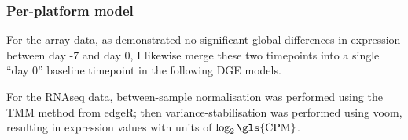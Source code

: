 

\subsubsection{Per-platform  model}

For the array data, as \autocite{sobolev2016AdjuvantedInfluenzaH1N1Vaccination} demonstrated no significant global differences in expression between day -7 and day 0, I likewise merge these two timepoints into a single \enquote{day 0} baseline timepoint in the following \gls{DGE} models.

For the \gls{RNAseq} data, between-sample normalisation was performed using the \gls{TMM} method\autocite{evans2018SelectingBetweensampleRNASeq} from edgeR\autocite{robinson2010EdgeRBioconductorPackage}; 
then variance-stabilisation was performed using voom\autocite{law2014VoomPrecisionWeights}, resulting in expression values with units of $\log_2{\text{\gls{CPM}}}$.

